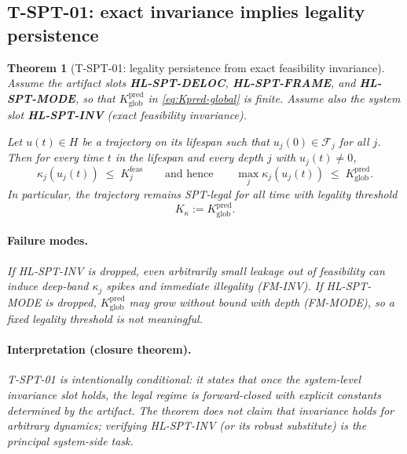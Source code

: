 \documentclass[11pt]{article}
\newtheorem{theorem}[definition]{Theorem}
\begin{document}
\subsection{T-SPT-01: exact invariance implies legality persistence}

\begin{theorem}[T-SPT-01: legality persistence from exact feasibility invariance]\label{thm:t-spt-01}
Assume the artifact slots \textbf{HL-SPT-DELOC}, \textbf{HL-SPT-FRAME}, and \textbf{HL-SPT-MODE}, so that $K^{\mathrm{pred}}_{\mathrm{glob}}$ in \eqref{eq:Kpred-global} is finite.
Assume also the system slot \textbf{HL-SPT-INV} (exact feasibility invariance).

Let $u(t)\in H$ be a trajectory on its lifespan such that $u_j(0)\in \mathcal{F}_j$ for all $j$.
Then for every time $t$ in the lifespan and every depth $j$ with $u_j(t)\neq 0$,
\begin{equation}\label{eq:t-spt-01-bound}
\kappa_j(u_j(t)) \;\le\; K^{\mathrm{feas}}_j
\qquad \text{and hence} \qquad
\max_{j}\kappa_j(u_j(t)) \;\le\; K^{\mathrm{pred}}_{\mathrm{glob}}.
\end{equation}
In particular, the trajectory remains SPT-legal for all time with legality threshold
\begin{equation}\label{eq:t-spt-01-K}
K_\kappa := K^{\mathrm{pred}}_{\mathrm{glob}}.
\end{equation}

\paragraph{Failure modes.}
If HL-SPT-INV is dropped, even arbitrarily small leakage out of feasibility can induce deep-band $\kappa_j$ spikes and immediate illegality (FM-INV).
If HL-SPT-MODE is dropped, $K^{\mathrm{pred}}_{\mathrm{glob}}$ may grow without bound with depth (FM-MODE), so a fixed legality threshold is not meaningful.

\paragraph{Interpretation (closure theorem).}
T-SPT-01 is intentionally conditional: it states that once the system-level invariance slot holds, the legal regime is forward-closed with explicit constants determined by the artifact.
The theorem does not claim that invariance holds for arbitrary dynamics; verifying HL-SPT-INV (or its robust substitute) is the principal system-side task.
\end{theorem}
\end{document}
